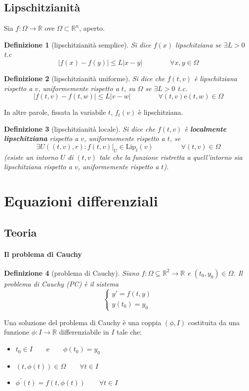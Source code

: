 \documentclass[a4paper,12pt]{article}
\newtheorem{defi}{Definizione}
\begin{document}
\subsection{Lipschitzianità}
Sia $f:\Omega\rightarrow\mathbb{R}$ ove $\Omega\subset\mathbb{R}^n$, aperto.
\begin{defi}[lipschitzianità semplice]
Si dice $f\left(x\right)$ lipschitziana se $\exists L>0$ t.c
$$ |f\left(x\right)- f\left(y\right)| \leq L|x-y|\qquad\qquad\forall x,y \in \Omega $$
\end{defi}

\begin{defi}[lipschitzianità uniforme]
Si dice che $f(t, v)$ è lipschitziana rispetto a $v$, uniformemente rispetto a $t$, su $\Omega$ se $\exists L>0$ t.c.
$$|f(t, v) - f(t, w)| \leq L|v-w|\qquad\qquad\forall (t,v)\text{e} (t, w) \in \Omega$$
\end{defi}
In altre parole, fissata la variabile $t$, $f_t(v)$ è lipschitziana.

\begin{defi}[lipschitzianità locale]
Si dice che $f(t, v)$ è \textbf{localmente lipschitziana} rispetto a $v$, uniformemente rispetto a $t$, se
$$\exists U((t, v), r) : f(t, v)|_U \in \text{Lip}_t(v)\qquad\qquad\forall(t, v)\in \Omega$$
(esiste un intorno $U$ di $(t, v)$ tale che la funzione ristretta a quell'intorno sia lipschitziana rispetto a $v$, uniformemente rispetto a $t$).
\end{defi}

\section{Equazioni differenziali}

\subsection{Teoria}
\paragraph{Il problema di Cauchy}
\begin{defi}[problema di Cauchy]
Siano $f:\Omega \subseteq \mathbb{R}^2 \rightarrow \mathbb{R}$ e $ \left(t_0,y_0\right) \in \Omega$. Il problema di Cauchy (PC) è il sistema
$$\label{PC}\begin{cases} y'=f\left(t,y\right) \\ y\left(t_0\right)=y_0 \end{cases}$$
\end{defi}
Una soluzione del problema di Cauchy è una coppia $\left( \phi , I \right)$ costituita da una funzione $\phi: I \rightarrow \mathbb{R}$ differenziabile in $I$ tale che:
\begin{itemize}
\item $t_0 \in I\qquad\text{e}\qquad \phi\left(t_0\right)=y_0$
\item $ \left(t,\phi\left(t\right)\right) \in \Omega \qquad \forall t \in I$
\item $ \phi^{'}\left(t \right) = f\left(t,\phi\left(t\right)\right)\qquad \forall t \in I$
\end{itemize}
\end{document}
